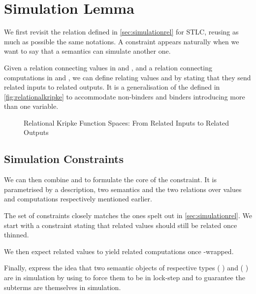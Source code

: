 \section{Simulation Lemma}\label{section:simulation}

We first revisit the  relation defined in \cref{sec:simulationrel}
for STLC, reusing as much as possible the same notations. A  constraint
appears naturally when we want to say that a semantics can simulate another one.

Given a relation  connecting values in  and , and a relation
 connecting computations in  and , we can define 
relating values    and    by
stating that they send related inputs to related outputs. It is a generalisation of
the  defined in \cref{fig:relationalkripke} to accommodate non-binders
and binders introducing more than one variable.

\begin{figure}[h]
\caption{Relational Kripke Function Spaces: From Related Inputs to Related Outputs}
\end{figure}

\subsection{Simulation Constraints}

We can then combine  and  to formulate the
core of the  constraint. It is parametrised by a description, two
semantics and the two relations over values and computations respectively mentioned
earlier.


The set of constraints closely matches the ones spelt out in \cref{sec:simulationrel}.
We start with a constraint  stating that related values should still be
related once thinned.


We then expect related values to yield related computations once -wrapped.


Finally,  express the idea that two semantic objects of respective types
   (  )
and    (  ) are in simulation by using
 to force them to be in lock-step and  to guarantee the subterms
are themselves in simulation.

